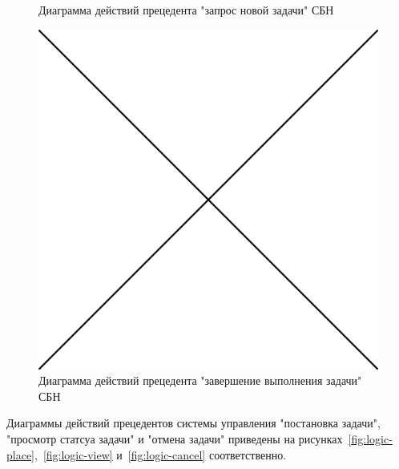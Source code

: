 \documentclass[a4paper,12pt]{report}
\numberwithin{equation}{section}
\begin{document}
\begin{figure}
\begin{minipage}{.49\linewidth}
    \caption{Диаграмма действий прецедента "запрос новой задачи" СБН}
    \label{fig:bal-request}
  \end{minipage}  
\end{figure}

\begin{figure}
  \centering
  \includegraphics[width=.6\linewidth]{img/placeholder} %
  \caption{Диаграмма действий прецедента "завершение выполнения задачи" СБН}
  \label{fig:bal-submit}
\end{figure}

Диаграммы действий прецедентов системы управления "постановка задачи", "просмотр статсуа задачи" и "отмена задачи" приведены на рисунках~\ref{fig:logic-place},~\ref{fig:logic-view} и~\ref{fig:logic-cancel} соответственно.
\end{document}

